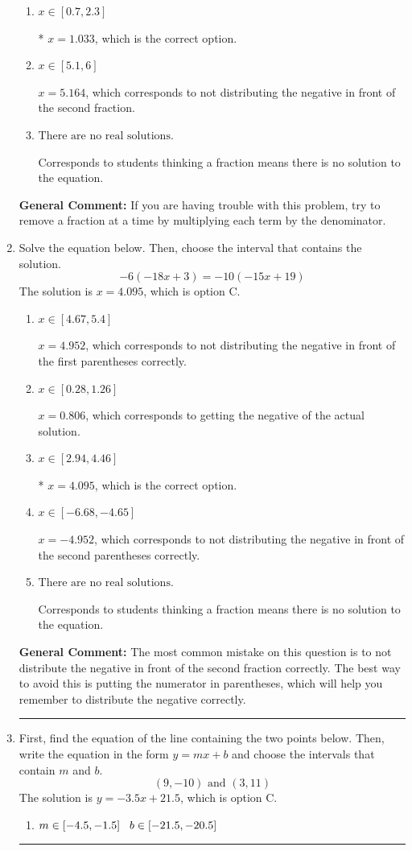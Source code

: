 \documentclass{extbook}[14pt]
\newcommand{\litem}[1]{\item #1

\rule{\textwidth}{0.4pt}}
\begin{document}
\begin{enumerate}
{\begin{enumerate}[label=\Alph*.]
 $x = 3.443$, which corresponds to dividing the coefficients in front of x by the denominator rather than dividing BOTH parts of the numerator by the denominator (or removing the fractions through multiplication).
\item \( x \in [0.7, 2.3] \)

* $x = 1.033$, which is the correct option.
\item \( x \in [5.1, 6] \)

 $x = 5.164$, which corresponds to not distributing the negative in front of the second fraction.
\item \( \text{There are no real solutions.} \)

Corresponds to students thinking a fraction means there is no solution to the equation.
\end{enumerate}

\textbf{General Comment:} If you are having trouble with this problem, try to remove a fraction at a time by multiplying each term by the denominator.
}
\litem{
Solve the equation below. Then, choose the interval that contains the solution.
\[ -6(-18x + 3) = -10(-15x + 19) \]The solution is \( x = 4.095 \), which is option C.\begin{enumerate}[label=\Alph*.]
\item \( x \in [4.67, 5.4] \)

$x = 4.952$, which corresponds to not distributing the negative in front of the first parentheses correctly.
\item \( x \in [0.28, 1.26] \)

$x = 0.806$, which corresponds to getting the negative of the actual solution.
\item \( x \in [2.94, 4.46] \)

* $x = 4.095$, which is the correct option.
\item \( x \in [-6.68, -4.65] \)

$x = -4.952$, which corresponds to not distributing the negative in front of the second parentheses correctly.
\item \( \text{There are no real solutions.} \)

Corresponds to students thinking a fraction means there is no solution to the equation.
\end{enumerate}

\textbf{General Comment:} The most common mistake on this question is to not distribute the negative in front of the second fraction correctly. The best way to avoid this is putting the numerator in parentheses, which will help you remember to distribute the negative correctly.
}
\litem{
First, find the equation of the line containing the two points below. Then, write the equation in the form $ y=mx+b $ and choose the intervals that contain $m$ and $b$.
\[ (9, -10) \text{ and } (3, 11) \]The solution is \( y = -3.5x + 21.5 \), which is option C.\begin{enumerate}[label=\Alph*.]
\item \( m \in [-4.5, -1.5] \hspace*{3mm} b \in [-21.5, -20.5] \)


\end{enumerate}}
\end{enumerate}
\end{document}
